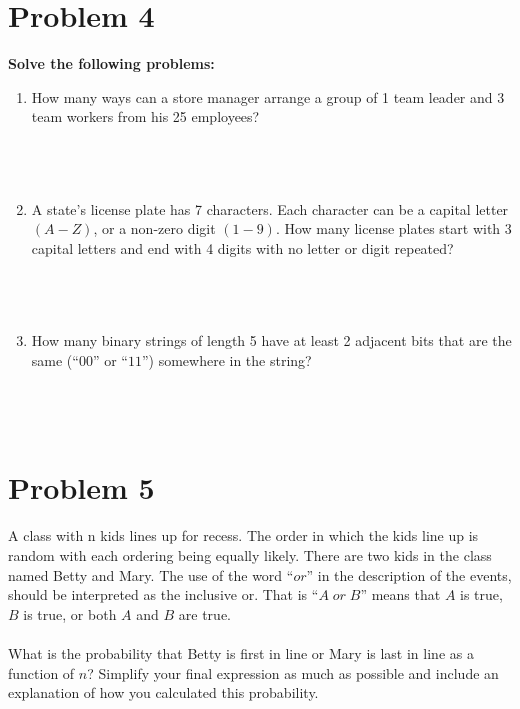 \documentclass{amsart}
\theoremstyle{definition}
\theoremstyle{Exercise}
\theoremstyle{remark}
\theoremstyle{rule}
\numberwithin{equation}{section}
\begin{document}
  \section*{Problem 4}
  {\bf Solve the following problems:}
  \begin{enumerate}[label=(\alph*)]
    \item How many ways can a store manager arrange a group of 1 team leader and 3 team workers from his 25 employees?
\\\\
\\\\
    \item A state’s license plate has 7 characters. Each character can be a capital letter $(A-Z)$, or a non-zero digit $(1-9)$. How many license plates start with 3 capital letters and end with 4 digits with no letter or digit repeated?
\\\\
\\\\
    \item How many binary strings of length 5 have at least 2 adjacent bits that are the same (``$00$'' or ``$11$'') somewhere in the string?
\\\\
\\\\
  \end{enumerate}
\newpage
  \section*{}
  \section*{}
  \section*{Problem 5}
  A class with n kids lines up for recess. The order in which the kids line up is random with each ordering being equally likely. There are two kids in the class named Betty and Mary. The use of the word ``$or$'' in the description of the events, should be interpreted as the inclusive or. That is ``$A \;or\; B$'' means that $A$ is true, $B$ is true, or both $A$ and $B$ are true.\\\\
  What is the probability that Betty is first in line or Mary is last in line as a function of $n$? Simplify your final expression as much as possible and include an explanation of how you calculated this probability.
\\\\
\\\\
  \newpage
\end{document}
